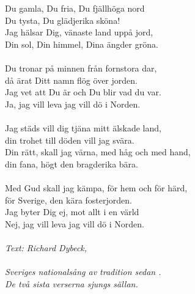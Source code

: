 \vspace{10pt}
Du gamla, Du fria, Du fjällhöga nord\\
Du tysta, Du glädjerika sköna!\\
Jag hälsar Dig, vänaste land uppå jord,\\
\revrpt Din sol, Din himmel, Dina ängder gröna.\rpt\\
\\
Du tronar på minnen från fornstora dar,\\
då ärat Ditt namn flög över jorden.\\
Jag vet att Du är och Du blir vad du var.\\
\revrpt Ja, jag vill leva jag vill dö i Norden.\rpt\\
\\
Jag städs vill dig tjäna mitt älskade land,\\
din trohet till döden vill jag svära.\\
Din rätt, skall jag värna, med håg och med hand,\\
\revrpt din fana, högt den bragderika bära.\rpt\\
\\
Med Gud skall jag kämpa, för hem och för härd,\\
för Sverige, den kära fosterjorden.\\
Jag byter Dig ej, mot allt i en värld\\
\revrpt Nej, jag vill leva jag vill dö i Norden.\rpt\\
\\
{\footnotesize\textit{Text: Richard Dybeck, \\
\\
Sveriges nationalsång av tradition sedan .\\
De två sista verserna sjungs sällan.}}

